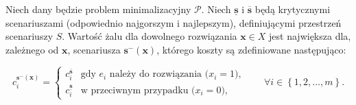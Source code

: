 \begin{theorem}\label{th:intminmaxreg}
	Niech dany będzie problem minimalizacyjny $\mathcal{P}$. Niech $\underline{\textbf{s}}$ i $\overline{\textbf{s}}$ będą krytycznymi scenariuszami (odpowiednio najgorszym i najlepszym), definiującymi przestrzeń scenariuszy $S$. Wartość żalu dla dowolnego rozwiązania $ \textbf{x} \in X$ jest największa dla, zależnego od $\textbf{x}$, scenariusza $\textbf{s}^{-} \left( \textbf{x} \right)$, którego koszty są zdefiniowane następująco:
	
	\begin{equation}
		c^{\textbf{s}^{-} \left( \textbf{x} \right)}_{i} = \left\{\begin{matrix}
			c^{\overline{\textbf{s}}}_{i} & \text{gdy $e_{i}$ należy do rozwiązania ($x_{i} = 1$),}\\ 
			c^{\underline{\textbf{s}}}_{i} &  \text{w przeciwnym przypadku ($x_{i} = 0$),}
		\end{matrix}\right. \qquad \forall i \in \left\{ 1, 2, \dots, m \right\}\text{.}
	\end{equation}
\end{theorem}

